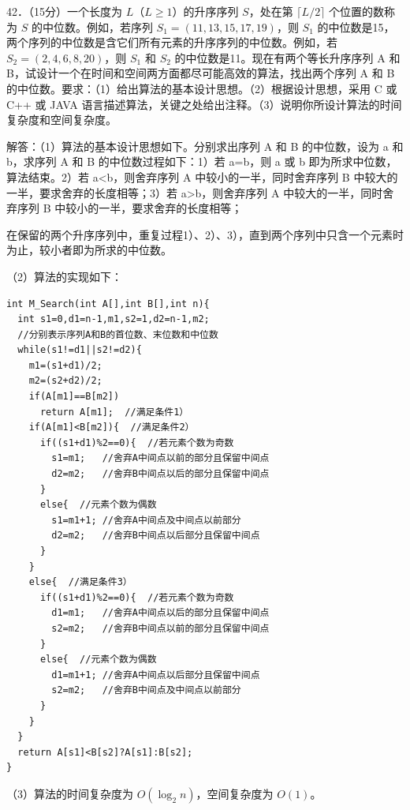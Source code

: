 \documentclass[UTF8,11pt]{ctexart}
\begin{document}
42．（15分）一个长度为 \(\displaystyle L\)（\(\displaystyle L\ge1\)）的升序序列 \(\displaystyle S\)，处在第 \(\displaystyle \lceil L/2\rceil\) 个位置的数称为 \(\displaystyle S\) 的中位数。例如，若序列 \(\displaystyle S_1=(11,\allowbreak 13,\allowbreak 15,\allowbreak 17,\allowbreak 19)\)，则 \(\displaystyle S_1\) 的中位数是15，两个序列的中位数是含它们所有元素的升序序列的中位数。例如，若 \(\displaystyle S_2=(2,\allowbreak 4,\allowbreak 6,\allowbreak 8,\allowbreak 20)\)，则 \(\displaystyle S_1\) 和 \(\displaystyle S_2\) 的中位数是11。现在有两个等长升序序列 A 和 B，试设计一个在时间和空间两方面都尽可能高效的算法，找出两个序列 A 和 B 的中位数。要求：（1）给出算法的基本设计思想。（2）根据设计思想，采用 C 或 C++ 或 JAVA 语言描述算法，关键之处给出注释。（3）说明你所设计算法的时间复杂度和空间复杂度。


解答：（1）算法的基本设计思想如下。分别求出序列 A 和 B 的中位数，设为 a 和 b，求序列 A 和 B 的中位数过程如下：1）若 a=b，则 a 或 b 即为所求中位数，算法结束。2）若 a<b，则舍弃序列 A 中较小的一半，同时舍弃序列 B 中较大的一半，要求舍弃的长度相等；3）若 a>b，则舍弃序列 A 中较大的一半，同时舍弃序列 B 中较小的一半，要求舍弃的长度相等；


在保留的两个升序序列中，重复过程1）、2）、3），直到两个序列中只含一个元素时为止，较小者即为所求的中位数。


（2）算法的实现如下：


\begin{Verbatim}[breaklines,breakanywhere,fontsize=\small]
int M_Search(int A[],int B[],int n){
  int s1=0,d1=n-1,m1,s2=1,d2=n-1,m2;
  //分别表示序列A和B的首位数、末位数和中位数
  while(s1!=d1||s2!=d2){
    m1=(s1+d1)/2;
    m2=(s2+d2)/2;
    if(A[m1]==B[m2])
      return A[m1];  //满足条件1）
    if(A[m1]<B[m2]){  //满足条件2）
      if((s1+d1)%2==0){  //若元素个数为奇数
        s1=m1;   //舍弃A中间点以前的部分且保留中间点
        d2=m2;   //舍弃B中间点以后的部分且保留中间点
      }
      else{  //元素个数为偶数
        s1=m1+1; //舍弃A中间点及中间点以前部分
        d2=m2;   //舍弃B中间点以后部分且保留中间点
      }
    }
    else{  //满足条件3）
      if((s1+d1)%2==0){  //若元素个数为奇数
        d1=m1;   //舍弃A中间点以后的部分且保留中间点
        s2=m2;   //舍弃B中间点以前的部分且保留中间点
      }
      else{  //元素个数为偶数
        d1=m1+1; //舍弃A中间点以后部分且保留中间点
        s2=m2;   //舍弃B中间点及中间点以前部分
      }
    }
  }
  return A[s1]<B[s2]?A[s1]:B[s2];
}
\end{Verbatim}

（3）算法的时间复杂度为 \(\displaystyle O(\log_2 n)\)，空间复杂度为 \(\displaystyle O(1)\)。
\end{document}
